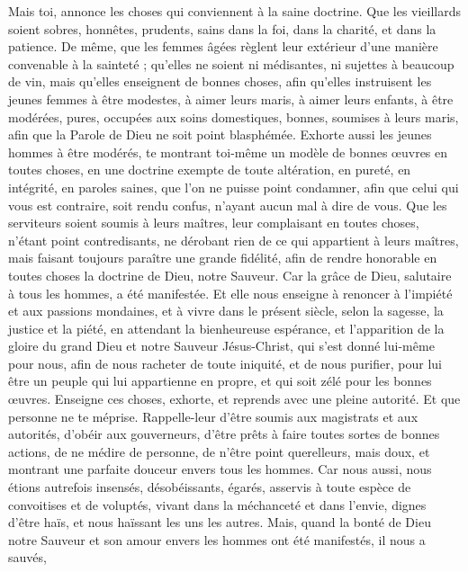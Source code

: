 \begin{multicols}{2}
\VerseOne{}Mais toi, annonce les choses qui conviennent à la saine doctrine.
Que les vieillards soient sobres, honnêtes, prudents, sains dans la foi, dans la charité, et dans la patience.
De même, que les femmes âgées règlent leur extérieur d'une manière convenable à la sainteté ; qu'elles ne soient ni médisantes, ni sujettes à beaucoup de vin, mais qu'elles enseignent de bonnes choses,
afin qu'elles instruisent les jeunes femmes à être modestes, à aimer leurs maris, à aimer leurs enfants,
à être modérées, pures, occupées aux soins domestiques, bonnes, soumises à leurs maris, afin que la Parole de Dieu ne soit point blasphémée.
Exhorte aussi les jeunes hommes à être modérés,
te montrant toi-même un modèle de bonnes œuvres en toutes choses, en une doctrine exempte de toute altération, en pureté, en intégrité,
en paroles saines, que l'on ne puisse point condamner, afin que celui qui vous est contraire, soit rendu confus, n'ayant aucun mal à dire de vous.
Que les serviteurs soient soumis à leurs maîtres, leur complaisant en toutes choses, n'étant point contredisants,
ne dérobant rien de ce qui appartient à leurs maîtres, mais faisant toujours paraître une grande fidélité, afin de rendre honorable en toutes choses la doctrine de Dieu, notre Sauveur.
Car la grâce de Dieu, salutaire à tous les hommes, a été manifestée.
Et elle nous enseigne à renoncer à l'impiété et aux passions mondaines, et à vivre dans le présent siècle, selon la sagesse, la justice et la piété,
en attendant la bienheureuse espérance, et l'apparition de la gloire du grand Dieu et notre Sauveur Jésus-Christ,
qui s'est donné lui-même pour nous, afin de nous racheter de toute iniquité, et de nous purifier, pour lui être un peuple qui lui appartienne en propre, et qui soit zélé pour les bonnes œuvres.
Enseigne ces choses, exhorte, et reprends avec une pleine autorité. Et que personne ne te méprise.
\VerseOne{}Rappelle-leur d'être soumis aux magistrats et aux autorités, d'obéir aux gouverneurs, d'être prêts à faire toutes sortes de bonnes actions,
de ne médire de personne, de n'être point querelleurs, mais doux, et montrant une parfaite douceur envers tous les hommes.
Car nous aussi, nous étions autrefois insensés, désobéissants, égarés, asservis à toute espèce de convoitises et de voluptés, vivant dans la méchanceté et dans l'envie, dignes d'être haïs, et nous haïssant les uns les autres.
Mais, quand la bonté de Dieu notre Sauveur et son amour envers les hommes ont été manifestés, il nous a sauvés,

\end{multicols}

